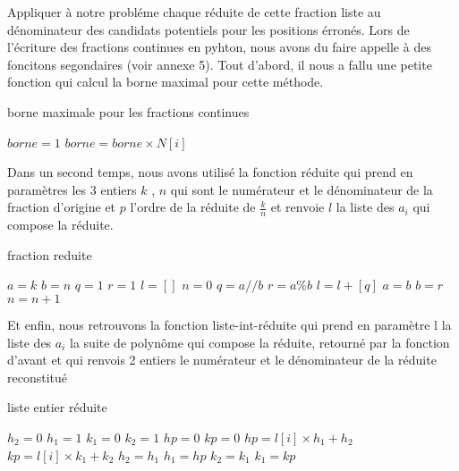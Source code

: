 \documentclass[a4paper, 11pt]{report}
\begin{document}
Appliquer à notre probléme chaque réduite de cette fraction liste au dénominateur des candidats potentiels pour les positions érronés.\newline
Lors de l'écriture des fractions continues en pyhton, nous avons du faire appelle à des foncitons segondaires (voir annexe 5). Tout d'abord, il nous a fallu une petite fonction qui calcul la borne maximal pour cette méthode.
\begin{algorithm}
    \caption{borne maximale pour les fractions continues}
    \begin{algorithmic}
        \STATE $borne=1$
        \STATE $borne=borne\times N[i]$
        \ENDFOR
    \end{algorithmic}
\end{algorithm}    
\newpage
Dans un second temps, nous avons utilisé la fonction réduite qui prend en paramètres les 3 entiers 
$k$ , $n$ qui sont le numérateur et le dénominateur de la fraction d'origine et $p$ l'ordre de la réduite de $\frac{k}{n}$ et renvoie $l$ la liste des $a_i$ qui compose la réduite.
\begin{algorithm}
    \caption{fraction reduite}
    \begin{algorithmic}
        \STATE $a=k$
        \STATE $b=n$
        \STATE $q=1$
        \STATE $r=1$
        \STATE $l=[]$
        \STATE $n=0$
        \STATE $q=a//b$
        \STATE $r=a\%b$
        \STATE $l=l+[q]$
        \STATE $a=b$
        \STATE $b=r$
        \STATE $n=n+1$
        \ENDIF
        \ENDWHILE
    \end{algorithmic}
\end{algorithm}
Et enfin, nous retrouvons la fonction liste-int-réduite qui prend en paramètre l la liste des $a_i$ la suite de polynôme qui compose la réduite, 
retourné par la fonction d'avant et qui renvois 2 entiers le numérateur et le dénominateur de la réduite reconstitué
\begin{algorithm}
    \caption{liste entier réduite}
    \begin{algorithmic}
        \STATE $h_2=0$
        \STATE $h_1=1$
        \STATE $k_1=0$
        \STATE $k_2=1$
        \STATE $hp=0$
        \STATE $kp=0$
        \STATE $hp=l[i]\times h_1+h_2$
        \STATE $kp=l[i]\times k_1+k_2$
        \STATE $h_2=h_1$
        \STATE $h_1=hp$
        \STATE $k_2=k_1$
        \STATE $k_1=kp$
        \ENDFOR
    \end{algorithmic}
\end{algorithm}
\end{document}
